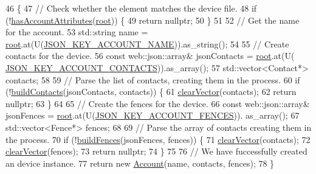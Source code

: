 \begin{DoxyCode}
46 \{
47     \textcolor{comment}{// Check whether the element matches the device file.}
48     \textcolor{keywordflow}{if} (!\hyperlink{class_account_builder_a6161184b277a8055ccab47411b14d195}{hasAccountAttributes}(\hyperlink{class_account_builder_a7fcd16decc7765ef0a5fbea02fa56877}{root})) \{
49         \textcolor{keywordflow}{return} \textcolor{keyword}{nullptr};
50     \}
51 
52     \textcolor{comment}{// Get the name for the account.}
53     std::string name = \hyperlink{class_account_builder_a7fcd16decc7765ef0a5fbea02fa56877}{root}.at(U(\hyperlink{_account_8h_ac2f820be22c4390a71ec34abe54694c5}{JSON\_KEY\_ACCOUNT\_NAME})).as\_string();
54 
55     \textcolor{comment}{// Create contacts for the device.}
56     \textcolor{keyword}{const} web::json::array& jsonContacts = \hyperlink{class_account_builder_a7fcd16decc7765ef0a5fbea02fa56877}{root}.at(U(
      \hyperlink{_account_8h_a9a5dc301a4b04c85ce3b865530cd6ca7}{JSON\_KEY\_ACCOUNT\_CONTACTS})).as\_array();
57     std::vector<Contact*> contacts;
58 
59     \textcolor{comment}{// Parse the list of contacts, creating them in the process.}
60     \textcolor{keywordflow}{if} (!\hyperlink{class_account_builder_aa3af3cf2501508d76ee3f7140deeba80}{buildContacts}(jsonContacts, contacts)) \{
61         \hyperlink{class_account_builder_aad3332b566e26b4b92215bf6500b26b6}{clearVector}(contacts);
62         \textcolor{keywordflow}{return} \textcolor{keyword}{nullptr};
63     \}
64 
65     \textcolor{comment}{// Create the fences for the device.}
66     \textcolor{keyword}{const} web::json::array& jsonFences = \hyperlink{class_account_builder_a7fcd16decc7765ef0a5fbea02fa56877}{root}.at(U(\hyperlink{_account_8h_a83ba8a12dba5582a5a125d3ced877c6e}{JSON\_KEY\_ACCOUNT\_FENCES})).
      as\_array();
67     std::vector<Fence*> fences;
68 
69     \textcolor{comment}{// Parse the array of contacts creating them in the process.}
70     \textcolor{keywordflow}{if} (!\hyperlink{class_account_builder_a1992add0c2ab404664d4cbae326c6ec7}{buildFences}(jsonFences, fences)) \{
71         \hyperlink{class_account_builder_aad3332b566e26b4b92215bf6500b26b6}{clearVector}(contacts);
72         \hyperlink{class_account_builder_aad3332b566e26b4b92215bf6500b26b6}{clearVector}(fences);
73         \textcolor{keywordflow}{return} \textcolor{keyword}{nullptr};
74     \}
75 
76     \textcolor{comment}{// We have fuccessfully created an device instance.}
77     \textcolor{keywordflow}{return} \textcolor{keyword}{new} \hyperlink{class_account}{Account}(name, contacts, fences);
78 \}
\end{DoxyCode}
